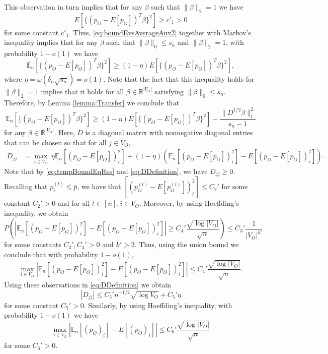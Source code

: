 \documentclass[opre,nonblindrev]{informs3} %
\def\En{{\mathbb{E}_n}}
\begin{document}
\begin{APPENDIX}{}
This observation in turn implies that   for any $\beta$ such that $\|\beta\|_2=1$ we have
\begin{equation}\label{eq:auxResultEigenBound}
E[\{(p_O- E[p_O])^T \beta\}^2] \geq c'_1>0
\end{equation}
for some constant $c'_1$.
Thus,  \eqref{eq:boundEvsAverageAux2} together with Markov's inequality implies that
for any $\beta$ such that
$\|\beta\|_0\leq s_n $ and
$\|\beta\|_2=1$,
with probability $1-o(1)$ we have
\begin{equation}\label{eq:tempBoundEqRes}
\En[\{(p_O-E[p_O])^T\beta\}^2] \geq (1-\eta)E[\{(p_O-E[p_O])^T\beta\}^2],
\end{equation}
where
$\eta = \omega(\delta_n \sqrt{s_n}) =o(1)$.
Note that the fact that this inequality holds for  $\|\beta\|_2=1$ implies that it holds for all $\beta \in \mathbb{R}^{|{V}_O|}$ satisfying $\|\beta\|_0\leq s_n $.
Therefore, by Lemma \ref{lemma:Transfer} we conclude that
\begin{equation}\label{eq:intStepAux}
\En[\{(p_O-E[p_O])^T \beta\}^2] \geq (1-\eta)E[\{(p_O-E[p_O])^T \beta\}^2]- \frac{\|D^{1/2}\beta\|_1^2}{s_n-1}
\end{equation}
for any $\beta \in \mathbb{R}^{|{V}_O|}$. Here,
$D$ is a diagonal matrix with nonnegative diagonal entries that can be chosen so that
for all $j\in {V}_O$,
\begin{equation} \label{eq:DDefinition}
\begin{aligned}
D_{jj} &= \max_{i\in {V}_O} ~
\eta\En[ (p_O-E[p_O])_i^2 ]+
(1-\eta) \left(\En[ ( p_O-E[p_O])_i^2 ]-
E[ ( p_O-E[p_O])_i^2 ] \right).
\end{aligned}
\end{equation}
Note that by \eqref{eq:tempBoundEqRes} and \eqref{eq:DDefinition}, we have
$D_{jj}\geq 0$.
Recalling that $p_i^{(t)}\leq \bar{p}$, we have that
$[ ( p_O^{(t)}-E[p_O^{(t)}])_i^2 ] \leq C_2'$ for some constant $C_2'>0$ and for all $t\in[n], i\in V_O$.
Moreover, by using Hoeffding's inequality,
we obtain
\[
P
\left(\left| \En[ ( p_O-E[p_O])_i^2 ]-
E[ ( p_O-E[p_O])_i^2 ]  \right|
\geq  C_4' \frac{\sqrt{\log |V_O|}}{\sqrt{n}}
\right)
\leq C_3' \frac{1}{|V_O|^{k'}}
\]
for some constants $C_3',C_4'>0$ and $k'>2$.
Thus, using the union bound we conclude that with probability $1-o(1)$,
\begin{equation} \label{eq:boundPDiff}
\max_{i \in {V}_O}
\left| \En[ ( p_O-E[p_O])_i^2 ]-
E[ ( p_O-E[p_O])_i^2 ]  \right|
\leq C_4' \frac{\sqrt{\log |V_O|}}{\sqrt{n}}.
\end{equation}
Using these observations in \eqref{eq:DDefinition} we obtain
\begin{equation}\label{eq:dBound}
|D_{jj}|\leq C_5'n^{-1/2}\sqrt{\log V_O} + C_5'\eta
\end{equation}
for some constant $C_5'> 0$.
Similarly, by using  Hoeffding's inequality, 
with probability $1-o(1)$ we have
\begin{equation} \label{eq:boundPDiff2}
\max_{i \in {V}_O}
\left| \En[  (p_O)_i ]-
E[ ( p_O)_i ]  \right|
\leq
C_6'
\frac{\sqrt{\log |V_O|}}{\sqrt{n}}
\end{equation}
for some $C_6'>0$.




\end{APPENDIX}
\end{document}
